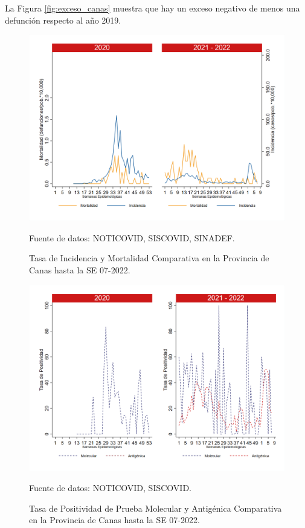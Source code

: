 \documentclass[12pt,a4paper,openany]{book}
\begin{document}
		La Figura \ref{fig:exceso_canas} muestra que hay un exceso negativo de menos una defunción respecto al año 2019.
		
		\begin{figure}[h]
			\caption{Tasa de Incidencia y Mortalidad Comparativa en la Provincia de Canas hasta la SE 07-2022.}\label{fig:inc_mort_canas}
			\begin{center}
				\includegraphics[width=0.7\linewidth]{../figuras/incidencia_mortalidad_20_21_3.png}
			\end{center}
			{\footnotesize {Fuente de datos: NOTICOVID, SISCOVID, SINADEF.}}
		\end{figure}
		
		\begin{figure}[h]
			\caption{Tasa de Positividad de Prueba Molecular y Antigénica Comparativa en la Provincia de Canas hasta la SE 07-2022.}\label{fig:positividad_canas}
			\begin{center}
				\includegraphics[width=0.7\linewidth]{../figuras/positividad_20_21_3.png}
			\end{center}
			{\footnotesize {Fuente de datos: NOTICOVID, SISCOVID.}}
		\end{figure}
		
\end{document}
